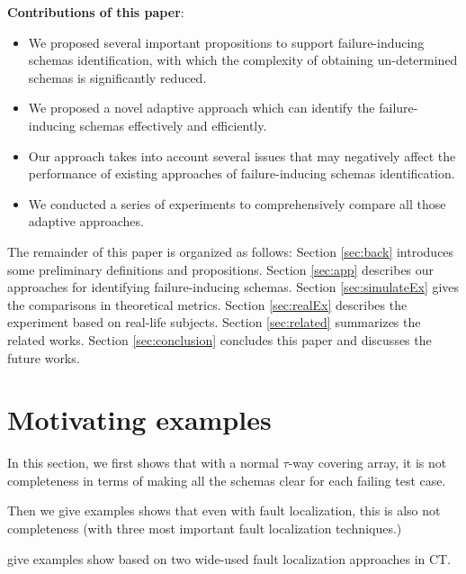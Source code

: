 \textbf{Contributions of this paper}:
\begin{itemize}
  \item We proposed several important propositions to support failure-inducing schemas identification, with which the complexity of obtaining un-determined schemas is significantly reduced.

  \item We proposed a novel adaptive approach which can identify the failure-inducing schemas effectively and efficiently.
  \item Our approach takes into account several issues that may negatively affect the performance of existing approaches of failure-inducing schemas identification.

  \item We conducted a series of experiments to comprehensively compare all those adaptive approaches.

\end{itemize}

The remainder of this paper is organized as follows: Section \ref{sec:back} introduces some preliminary definitions and propositions.
 Section \ref{sec:app} describes our approaches for identifying failure-inducing schemas. Section \ref{sec:simulateEx} gives the comparisons in theoretical metrics. Section \ref{sec:realEx} describes the experiment based on real-life subjects. Section \ref{sec:related} summarizes the related works. Section \ref{sec:conclusion} concludes this paper and discusses the future works.


\section{Motivating examples}\label{motiv}

In this section, we first shows that with a normal $\tau$-way covering array, it is not completeness in terms of making  all the schemas clear for each failing test case.

Then we give examples shows that even with fault localization, this is also not completeness (with three most important fault localization techniques.)

give examples show based on two wide-used fault localization approaches in CT.

